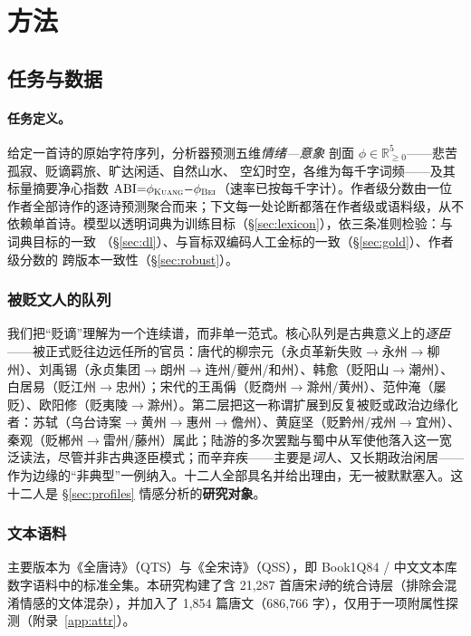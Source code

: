 \documentclass[11pt]{article}
\begin{document}
\section{方法}
\label{sec:method}
\subsection{任务与数据}
\label{sec:data}
\paragraph{任务定义。}给定一首诗的原始字符序列，分析器预测五维\emph{情绪—意象}
剖面 $\phi\in\mathbb{R}_{\ge0}^{5}$——悲苦孤寂、贬谪羁旅、旷达闲适、自然山水、
空幻时空，各维为每千字词频——及其标量摘要净心指数
$\mathrm{ABI}{=}\phi_{\textsc{Kuang}}{-}\phi_{\textsc{Bei}}$（速率已按每千字计）。作者级分数由一位作者全部诗作的逐诗预测聚合而来；下文每一处论断都落在作者级或语料级，从不依赖单首诗。模型以透明词典为训练目标（\S\ref{sec:lexicon}），依三条准则检验：与词典目标的一致
（\S\ref{sec:dl}）、与盲标双编码人工金标的一致（\S\ref{sec:gold}）、作者级分数的
跨版本一致性（\S\ref{sec:robust}）。

\subsubsection{被贬文人的队列}
\label{sec:cohort}
我们把“贬谪”理解为一个连续谱，而非单一范式。核心队列是古典意义上的\emph{逐臣}——被正式贬往边远任所的官员：唐代的柳宗元（永贞革新失败$\to$永州$\to$柳州）、刘禹锡（永贞集团$\to$朗州$\to$连州/夔州/和州）、韩愈（贬阳山$\to$潮州）、白居易（贬江州$\to$忠州）；宋代的王禹偁（贬商州$\to$滁州/黄州）、范仲淹（屡贬）、欧阳修（贬夷陵$\to$滁州）。第二层把这一称谓扩展到反复被贬或政治边缘化者：苏轼（乌台诗案$\to$黄州$\to$惠州$\to$儋州）、黄庭坚（贬黔州/戎州$\to$宜州）、秦观（贬郴州$\to$雷州/藤州）属此；陆游的多次罢黜与蜀中从军使他落入这一宽泛读法，尽管并非古典逐臣模式；而辛弃疾——主要是\emph{词}人、又长期政治闲居——作为边缘的“非典型”一例纳入。十二人全部具名并给出理由，无一被默默塞入。这十二人是 \S\ref{sec:profiles} 情感分析的\textbf{研究对象}。

\subsubsection{文本语料}
\label{sec:corpus}
主要版本为《全唐诗》（QTS）与《全宋诗》（QSS），即 Book1Q84 / 中文文本库数字语料中的标准全集。本研究构建了含 21{,}287 首唐宋\emph{诗}的统合诗层（排除会混淆情感的文体混杂），并加入了 1{,}854 篇唐文（686{,}766 字），仅用于一项附属性探测（附录~\ref{app:attr}）。
\end{document}
